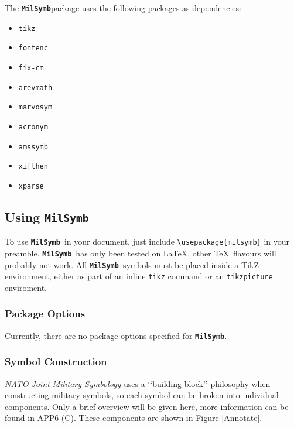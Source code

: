 \documentclass[a4paper, titlepage]{article}
\newcommand\MilSymb{\textbf{\texttt{MilSymb}}}
\newcommand\DocLink{\href{https://www.awl.edu.pl/images/en/APP_6_C.pdf}{APP6-(C)}}
\begin{document}
The \MilSymb package uses the following packages as dependencies:

\begin{itemize}
\item \texttt{tikz}
\item \texttt{fontenc}
\item \texttt{fix-cm}
\item \texttt{arevmath}
\item \texttt{marvosym}
\item \texttt{acronym}
\item \texttt{amssymb}
\item \texttt{xifthen}
\item \texttt{xparse}
\end{itemize}

\subsection{Using \MilSymb}

To use \MilSymb\  in your document, just include \texttt{\textbackslash usepackage\{milsymb\}} in your preamble. \MilSymb\  has only been tested on \LaTeX, other \TeX\  flavours will probably not work. All \MilSymb\  symbols must be placed inside a TikZ environment, either as part of an inline \texttt{tikz} command or an \texttt{tikzpicture} enviroment. 

\subsubsection{Package Options}

Currently, there are no package options specified for \MilSymb.

\subsubsection{Symbol Construction}

\textit{NATO Joint Military Symbology} uses a \lq\lq{}building block\rq\rq{} philosophy when constructing military symbols, so each symbol can be broken into individual components. Only a brief overview will be given here, more information can be found in \DocLink. These components are shown in Figure \ref{Annotate}.
\end{document}
